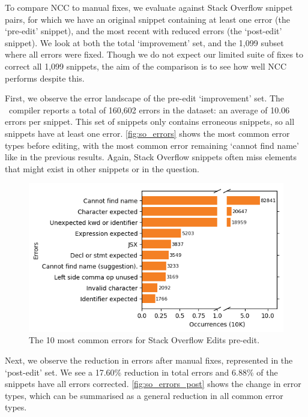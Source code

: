 \documentclass[conference]{IEEEtran}
\begin{document}
To compare NCC to manual fixes, we evaluate against Stack Overflow snippet pairs, for which we have an original snippet containing at least one error (the `pre-edit' snippet), and the most recent with reduced errors (the `post-edit' snippet). We look at both the total `improvement' set, and the 1,099 subset where all errors were fixed. Though we do not expect our limited suite of fixes to correct all 1,099 snippets, the aim of the comparison is to see how well NCC performs despite this.

First, we observe the error landscape of the pre-edit `improvement' set. The \ts\ compiler reports a total of 160,602 errors in the dataset: an average of 10.06 errors per snippet. This set of snippets only contains erroneous snippets, so all snippets have at least one error. \autoref{fig:so_errors} shows the most common error types before editing, with the most common error remaining `cannot find name' like in the previous results. Again, Stack Overflow snippets often miss elements that might exist in other snippets or in the question.

\begin{figure}[h]
    \centering
    \includegraphics[width=0.8\linewidth]{images/soi_errorTypes.png}
    \caption{The 10 most common errors for Stack Overflow Edits pre-edit.}
    \label{fig:so_errors}
\end{figure}

Next, we observe the reduction in errors after manual fixes, represented in the `post-edit' set. We see a 17.60\% reduction in total errors and 6.88\% of the snippets have all errors corrected.  \autoref{fig:so_errors_post} shows the change in error types, which can be summarised as a general reduction in all common error types.
\end{document}
